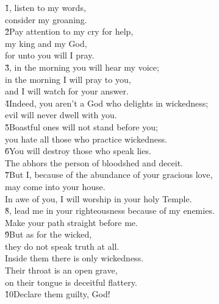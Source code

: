 \begin{poetry}
\poeml \v{1}, listen to my words, \\
\poemll    consider my groaning. \\
\poeml \v{2}Pay attention to my cry for help, \\
\poemll    my king and my God, \\
\poemlll       for unto you will I pray. \\
\poeml \v{3}, in the morning you will hear my voice; \\
\poemll    in the morning I will pray to you, \\
\poemll    and I will watch for your answer. \\
\poeml \v{4}Indeed, you aren't a God who delights in wickedness; \\
\poemll    evil will never dwell with you. \\
\poeml \v{5}Boastful ones will not stand before you; \\
\poemll    you hate all those who practice wickedness. \\
\poeml \v{6}You will destroy those who speak lies. \\
\poemll    The  abhors the person of bloodshed and deceit. \\
\poeml \v{7}But I, because of the abundance of your gracious love, \\
\poemll    may come into your house. \\
\poemlll       In awe of you, I will worship in your holy Temple. \\
\poeml \v{8}, lead me in your righteousness because of my enemies. \\
\poemll    Make your path straight before me. \\
\poeml \v{9}But as for the wicked, \\
\poemll    they do not speak truth at all. \\
\poemlll       Inside them there is only wickedness. \\
\poeml Their throat is an open grave, \\
\poemll    on their tongue is deceitful flattery. \\
\poeml \v{10}Declare them guilty, God! \\

\end{poetry}
